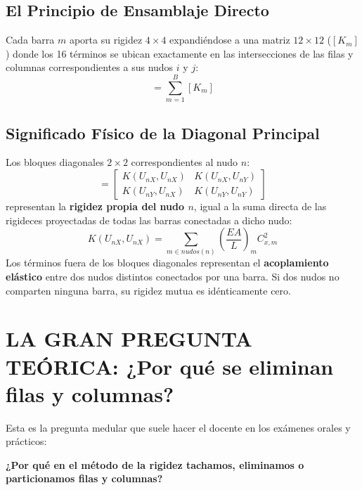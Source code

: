 \documentclass[11pt,a4paper]{article}
\begin{document}
\subsection{El Principio de Ensamblaje Directo}
Cada barra $m$ aporta su rigidez $4 \times 4$ expandiéndose a una matriz $12 \times 12$ ($[K_m]$) donde los 16 términos se ubican exactamente en las intersecciones de las filas y columnas correspondientes a sus nudos $i$ y $j$:
\begin{equation}
    [K_{global}] = \sum_{m=1}^{B} [K_m]
\end{equation}

\subsection{Significado Físico de la Diagonal Principal}
Los bloques diagonales $2 \times 2$ correspondientes al nudo $n$:
\begin{equation}
    [K_{diag, n}] = \begin{bmatrix} K(U_{nX}, U_{nX}) & K(U_{nX}, U_{nY}) \\ K(U_{nY}, U_{nX}) & K(U_{nY}, U_{nY}) \end{bmatrix}
\end{equation}
representan la \textbf{rigidez propia del nudo $n$}, igual a la suma directa de las rigideces proyectadas de todas las barras conectadas a dicho nudo:
\begin{equation}
    K(U_{nX}, U_{nX}) = \sum_{m \in nudos(n)} \left(\frac{EA}{L}\right)_m C_{x, m}^2
\end{equation}
Los términos fuera de los bloques diagonales representan el \textbf{acoplamiento elástico} entre dos nudos distintos conectados por una barra. Si dos nudos no comparten ninguna barra, su rigidez mutua es idénticamente cero.

\section{LA GRAN PREGUNTA TEÓRICA: ¿Por qué se eliminan filas y columnas?}

Esta es la pregunta medular que suele hacer el docente en los exámenes orales y prácticos:
\begin{center}
\textbf{¿Por qué en el método de la rigidez tachamos, eliminamos o particionamos filas y columnas?}
\end{center}
\end{document}
